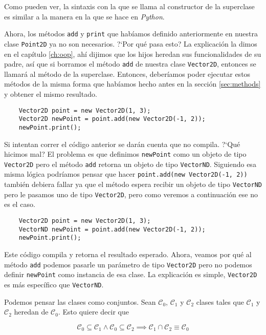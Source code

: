   Como pueden ver, la sintaxis con la que se llama al constructor de la superclase es 
  similar a la manera en la que se hace en \textit{Python}.

  Ahora, los métodos \texttt{add} y \texttt{print} que habíamos definido anteriormente en 
  nuestra clase \texttt{Point2D} ya no son necesarios.
  ?`Por qué pasa esto?
  La explicación la dimos en el capítulo \ref{ch:oop}, ahí dijimos que los hijos heredan 
  sus funcionalidades de su padre, así que si borramos el método \texttt{add} de nuestra
  clase \texttt{Vector2D}, entonces se llamará al método de la superclase.
  Entonces, deberíamos poder ejecutar estos métodos de la misma forma que habíamos hecho 
  antes en la sección \ref{sec:methods} y obtener el mismo resultado.

  \begin{verbatim}
    Vector2D point = new Vector2D(1, 3);
    Vector2D newPoint = point.add(new Vector2D(-1, 2));
    newPoint.print();
  \end{verbatim}

  Si intentan correr el código anterior se darán cuenta que no compila.
  ?`Qué hicimos mal?
  El problema es que definimos \texttt{newPoint} como un objeto de tipo \texttt{Vector2D}
  pero el método \texttt{add} retorna un objeto de tipo \texttt{VectorND}.
  Siguiendo esa misma lógica podríamos pensar que hacer 
  \texttt{point.add(new Vector2D(-1, 2))} también debiera fallar ya que el 
  método espera recibir un objeto de tipo \texttt{VectorND} pero le pasamos uno de tipo
  \texttt{Vector2D}, pero como veremos a continuación ese no es el caso.

  \begin{verbatim}
    Vector2D point = new Vector2D(1, 3);
    VectorND newPoint = point.add(new Vector2D(-1, 2));
    newPoint.print();
  \end{verbatim}

  Este código compila y retorna el resultado esperado.
  Ahora, veamos por qué al método \texttt{add} podemos pasarle un parámetro de tipo 
  \texttt{Vector2D} pero no podemos definir \texttt{newPoint} como instancia de esa clase.
  La explicación es simple, \texttt{Vector2D} es más específico que \texttt{VectorND}.
  
  Podemos pensar las clases como conjuntos.
  Sean \(\mathcal{C}_0,\, \mathcal{C}_1\) y \(\mathcal{C}_2\) clases tales que 
  \(\mathcal{C}_1\) y \(\mathcal{C}_2\) heredan de \(\mathcal{C}_0\).
  Esto quiere decir que 

  \[
    \mathcal{C}_0 \subseteq \mathcal{C}_1 \wedge \mathcal{C}_0 \subseteq \mathcal{C}_2
      \implies \mathcal{C}_1 \cap \mathcal{C}_2 \equiv \mathcal{C}_0
  \]
  
